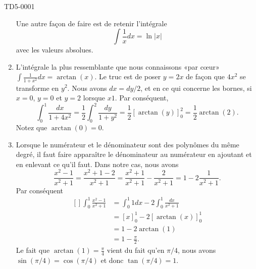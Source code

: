 \begin{corrige}{TD5-0001}
\begin{enumerate}
			Une autre façon de faire est de retenir l'intégrale
			\begin{equation}
				\int \frac{1}{ x }dx=\ln| x |
			\end{equation}
			avec les valeurs absolues.
		\item
			L'intégrale la plus ressemblante que nous connaissons «par cœur» $\int\frac{1}{ 1+x^2 }dx=\arctan(x)$. Le truc est de poser $y=2x$ de façon que $4x^2$ se transforme en $y^2$. Nous avons $dx=dy/2$, et en ce qui concerne les bornes, si $x=0$, $y=0$ et $y=2$ lorsque $x1$. Par conséquent,
			\begin{equation}
				\int_0^1\frac{ dx }{ 1+4x^2 }=\frac{ 1 }{2}\int_0^2\frac{ dy }{ 1+y^2 }=\frac{ 1 }{2}\left[ \arctan(y) \right]_0^2=\frac{ 1 }{2}\arctan(2).
			\end{equation}
			Notez que $\arctan(0)=0$.
		\item
			Lorsque le numérateur et le dénominateur sont des polynômes du même degré, il faut faire apparaître le dénominateur au numérateur en ajoutant et en enlevant ce qu'il faut. Dans notre cas, nous avons 
			\begin{equation}
				\frac{ x^2-1 }{ x^2+1 }=\frac{ x^2+1-2 }{ x^2+1 }=\frac{ x^2+1 }{ x^2+1 }-\frac{ 2 }{ x^2+1 }=1-2\frac{ 1 }{ x^2+1 }.
			\end{equation}
			Par conséquent
			\begin{equation}
				\begin{aligned}[]
					\int_0^1\frac{ x^2-1 }{ x^2+1 }&=\int_0^1 1dx-2\int_0^1\frac{ dx }{ x^2+1 }\\
					&=[x]_0^1-2\left[ \arctan(x) \right]^1_0\\
					&=1-2\arctan(1)\\
					&=1-\frac{ \pi }{ 2 }.
				\end{aligned}
			\end{equation}
			Le fait que $\arctan(1)=\frac{ \pi }{ 4 }$ vient du fait qu'en $\pi/4$, nous avons $\sin(\pi/4)=\cos(\pi/4)$ et donc $\tan(\pi/4)=1$.


\end{enumerate}
\end{corrige}
